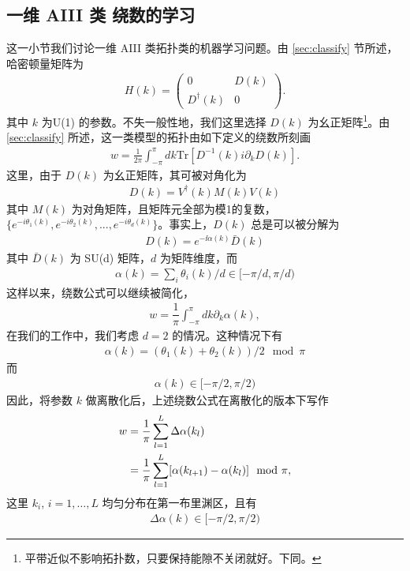 \subsection{一维 AIII 类 绕数的学习}
这一小节我们讨论一维 AIII 类拓扑类的机器学习问题。由 \ref{sec:classify} 节所述，哈密顿量矩阵为
\begin{align}\label{eq:D(k)}
    H(k)=\begin{pmatrix} 0 & D(k) \\ D^{\dagger}(k) & 0 \end{pmatrix}.
\end{align}
其中 $k$ 为U(1) 的参数。不失一般性地，我们这里选择 $D(k)$ 为幺正矩阵\footnote{平带近似不影响拓扑数，只要保持能隙不关闭就好。下同。}。由 \ref{sec:classify} 所述，这一类模型的拓扑由如下定义的绕数所刻画
\begin{align}
    w=\frac{1}{2\pi}\int_{-\pi}^{\pi}dk\mathrm{Tr}[D^{-1}(k)i\partial_kD(k)]. \label{wd1}
\end{align}
这里，由于 $D(k)$ 为幺正矩阵，其可被对角化为
\begin{align}
D(k) = V^\dag(k)M(k)V(k)
\end{align}
其中 $M(k)$ 为对角矩阵，且矩阵元全部为模1的复数，$\{e^{-i\theta_1(k)}, e^{-i\theta_2(k)},...,e^{-i\theta_d(k)}\}$。事实上，$D(k)$ 总是可以被分解为
\begin{align}
D(k) = e^{-\ii\alpha(k)}\bar{D}(k)
\end{align}
其中 $\bar{D}(k)$ 为 SU(d) 矩阵，$d$ 为矩阵维度，而
\begin{align}
\alpha(k)=\sum_i\theta_i(k)/d\in [-\pi/d,\pi/d)
\end{align}
这样以来，绕数公式可以继续被简化，
\begin{align}\label{eq:wdalpha}
    w=\dfrac{1}{\pi}\int_{-\pi}^{\pi}dk\partial_k\alpha(k),
\end{align}
在我们的工作中\cite{topoml}，我们考虑 $d=2$ 的情况。这种情况下有
\begin{align}
\alpha(k)=(\theta_1(k)+\theta_2(k))/2 \mod \pi
\end{align}
而
\begin{align}
\alpha(k)\in[-\pi/2,\pi/2)
\end{align}
因此，将参数 $k$ 做离散化后，上述绕数公式在离散化的版本下写作
\begin{align}
    w &=\dfrac{1}{\pi}\sum_{l=1}^{L}\Delta\alpha(k_l) \notag\\
        &=\dfrac{1}{\pi}\sum_{l=1}^{L}[\alpha(k_{l+1})-\alpha(k_l)]\mod \pi, \label{wd_dis}
\end{align}
这里 $ k_i $, $ i=1,\ldots,L $ 均匀分布在第一布里渊区，且有
\begin{align}
\Delta\alpha(k)\in[-\pi/2,\pi/2)
\end{align}

